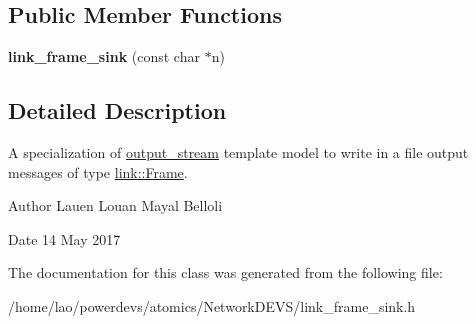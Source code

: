 \subsection*{Public Member Functions}
\begin{DoxyCompactItemize}
\item 
{\bfseries link\+\_\+frame\+\_\+sink} (const char $\ast$n)\hypertarget{classlink__frame__sink_a34ab220d2e602bf129b3ca2ca893f00f}{}\label{classlink__frame__sink_a34ab220d2e602bf129b3ca2ca893f00f}

\end{DoxyCompactItemize}


\subsection{Detailed Description}
A specialization of \hyperlink{classoutput__stream}{output\+\_\+stream} template model to write in a file output messages of type \hyperlink{structlink_1_1Frame}{link\+::\+Frame}. 

\begin{DoxyAuthor}{Author}
Lauen Louan Mayal Belloli 
\end{DoxyAuthor}
\begin{DoxyDate}{Date}
14 May 2017 
\end{DoxyDate}


The documentation for this class was generated from the following file\+:\begin{DoxyCompactItemize}
\item 
/home/lao/powerdevs/atomics/\+Network\+D\+E\+V\+S/link\+\_\+frame\+\_\+sink.\+h\end{DoxyCompactItemize}
